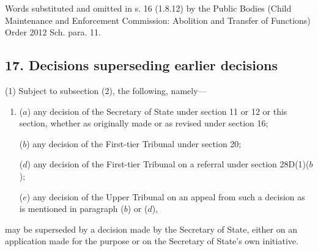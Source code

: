 \documentclass[a4paper]{article}
\begin{document}
{

Words substituted and omitted in s. 16 (1.8.12) by the Public Bodies (Child Maintenance and Enforcement
Commission: Abolition and Transfer of Functions) Order 2012 Sch. para. 11.

}

\subsection{17. Decisions superseding earlier decisions}

(1) Subject to subsection (2), the following, namely---
\begin{enumerate}\item[]
($a$) any decision of the Secretary of State under section 11 or 12 or this section,
whether as originally made or as revised under section 16;

($b$) any decision of the First-tier Tribunal under section 20;

($d$) any decision of the First-tier Tribunal on a referral under section
28D(1)($b$);

($e$) any decision of the Upper Tribunal on an appeal from such a decision as
is mentioned in paragraph ($b$) or ($d$),
\end{enumerate}
may be superseded by a decision made by the Secretary of State, either on an application made for the purpose or on the Secretary of State’s own initiative.

\end{document}
